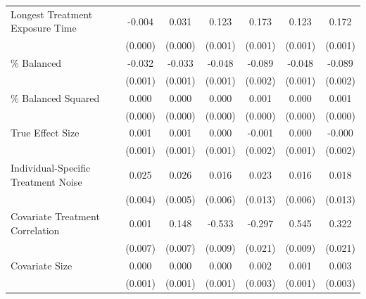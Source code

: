\documentclass[12pt]{article}
\begin{document}
\begin{landscape}
\begin{table}[htbp]
{\begin{tabular}{l*{6}{c}}
Longest Treatment Exposure Time&      -0.004\sym{***}&       0.031\sym{***}&       0.123\sym{***}&       0.173\sym{***}&       0.123\sym{***}&       0.172\sym{***}\\
                    &     (0.000)         &     (0.000)         &     (0.001)         &     (0.001)         &     (0.001)         &     (0.001)         \\
\% Balanced         &      -0.032\sym{***}&      -0.033\sym{***}&      -0.048\sym{***}&      -0.089\sym{***}&      -0.048\sym{***}&      -0.089\sym{***}\\
                    &     (0.001)         &     (0.001)         &     (0.001)         &     (0.002)         &     (0.001)         &     (0.002)         \\
\% Balanced Squared &       0.000\sym{***}&       0.000\sym{***}&       0.000\sym{***}&       0.001\sym{***}&       0.000\sym{***}&       0.001\sym{***}\\
                    &     (0.000)         &     (0.000)         &     (0.000)         &     (0.000)         &     (0.000)         &     (0.000)         \\
True Effect Size    &       0.001         &       0.001\sym{*}  &       0.000         &      -0.001         &       0.000         &      -0.000         \\
                    &     (0.001)         &     (0.001)         &     (0.001)         &     (0.002)         &     (0.001)         &     (0.002)         \\
Individual-Specific Treatment Noise&       0.025\sym{***}&       0.026\sym{***}&       0.016\sym{**} &       0.023         &       0.016\sym{**} &       0.018         \\
                    &     (0.004)         &     (0.005)         &     (0.006)         &     (0.013)         &     (0.006)         &     (0.013)         \\
Covariate Treatment Correlation&       0.001         &       0.148\sym{***}&      -0.533\sym{***}&      -0.297\sym{***}&       0.545\sym{***}&       0.322\sym{***}\\
                    &     (0.007)         &     (0.007)         &     (0.009)         &     (0.021)         &     (0.009)         &     (0.021)         \\
Covariate Size      &       0.000         &       0.000         &       0.000         &       0.002         &       0.001         &       0.003         \\
                    &     (0.001)         &     (0.001)         &     (0.001)         &     (0.003)         &     (0.001)         &     (0.003)         \\

\end{tabular}}
\end{table}
\end{landscape}
\end{document}
